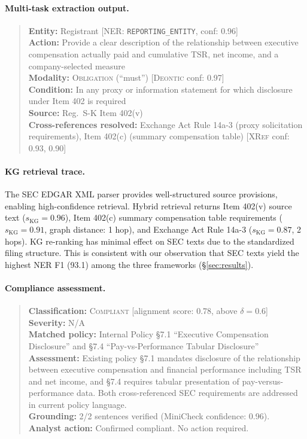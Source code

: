 \documentclass[11pt]{article}
\begin{document}
\paragraph{Multi-task extraction output.}
\begin{quote}
	\small
	\textbf{Entity:} Registrant \hfill [\textsc{NER}: \texttt{REPORTING\_ENTITY}, conf: 0.96] \\
	\textbf{Action:} Provide a clear description of the relationship between executive compensation actually paid and cumulative TSR, net income, and a company-selected measure \\
	\textbf{Modality:} \textsc{Obligation} (``must'') \hfill [\textsc{Deontic} conf: 0.97] \\
	\textbf{Condition:} In any proxy or information statement for which disclosure under Item 402 is required \\
	\textbf{Source:} Reg.~S-K Item 402(v) \\
	\textbf{Cross-references resolved:} Exchange Act Rule 14a-3 (proxy solicitation requirements), Item 402(c) (summary compensation table) \hfill [\textsc{XRef} conf: 0.93, 0.90]
\end{quote}

\paragraph{KG retrieval trace.}  The SEC EDGAR XML parser provides well-structured source provisions, enabling high-confidence retrieval. Hybrid retrieval returns Item 402(v) source text ($s_{\text{KG}}{=}0.96$), Item 402(c) summary compensation table requirements ($s_{\text{KG}}{=}0.91$, graph distance: 1 hop), and Exchange Act Rule 14a-3 ($s_{\text{KG}}{=}0.87$, 2 hops). KG re-ranking has minimal effect on SEC texts due to the standardized filing structure. This is consistent with our observation that SEC texts yield the highest NER F1 (93.1) among the three frameworks (\S\ref{sec:results}).

\paragraph{Compliance assessment.}
\begin{quote}
	\small
	\textbf{Classification:} \textsc{Compliant} \hfill [alignment score: 0.78, above $\delta{=}0.6$] \\
	\textbf{Severity:} N/A \\
	\textbf{Matched policy:} Internal Policy \S7.1 ``Executive Compensation Disclosure'' and \S7.4 ``Pay-vs-Performance Tabular Disclosure'' \\
	\textbf{Assessment:} Existing policy \S7.1 mandates disclosure of the relationship between executive compensation and financial performance including TSR and net income, and \S7.4 requires tabular presentation of pay-versus-performance data. Both cross-referenced SEC requirements are addressed in current policy language. \\
	\textbf{Grounding:} 2/2 sentences verified (MiniCheck confidence: 0.96). \\
	\textbf{Analyst action:} Confirmed compliant. No action required.
\end{quote}
\end{document}
